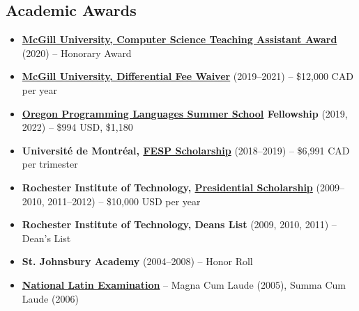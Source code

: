 \documentclass[letterpaper,11pt]{article}
\newcommand{\resumeItem}[2]{
  \item\small{\textbf{#1}{ #2 }}
}
\newcommand{\resumeSubItem}[2]{\resumeItem{#1}{#2}}
\newcommand{\resumeSubHeadingListStart}{\begin{itemize}[leftmargin=*]}
\newcommand{\resumeSubHeadingListEnd}{\end{itemize}}
\begin{document}
\begin{justify}
\section{Academic Awards}
\resumeSubHeadingListStart
\resumeSubItem{\href{https://www.cs.mcgill.ca/academic/ta/awards/winners/}{McGill University, Computer Science Teaching Assistant Award}}{(2020) -- Honorary Award}
\resumeSubItem{\href{https://www.mcgill.ca/expmed/funding-and-awards/differential-fee-waivers}{McGill University, Differential Fee Waiver}}{(2019--2021) -- \$12,000 CAD per year}
\resumeSubItem{\href{https://www.cs.uoregon.edu/research/summerschool/summer19/}{Oregon Programming Languages Summer School} Fellowship}{(2019, 2022) -- \$994 USD, \$1,180}
\resumeSubItem{Universit\'e de Montr\'eal, \href{https://esp.umontreal.ca/english/what-you-need-to-know/international/scholarship/}{FESP Scholarship}}{(2018--2019) -- \$6,991 CAD per trimester}
\resumeSubItem{Rochester Institute of Technology, \href{https://www.rit.edu/admissions/aid/merit-based-scholarships}{Presidential Scholarship}}{(2009--2010, 2011--2012) -- \$10,000 USD per year}
\resumeSubItem{Rochester Institute of Technology, Deans List}{(2009, 2010, 2011) -- Dean's List}
\resumeSubItem{St. Johnsbury Academy}{(2004--2008) -- Honor Roll}
\resumeSubItem{\href{https://www.nle.org/}{National Latin Examination}}{-- Magna Cum Laude (2005), Summa Cum Laude (2006)}
\resumeSubHeadingListEnd


\end{justify}
\end{document}
